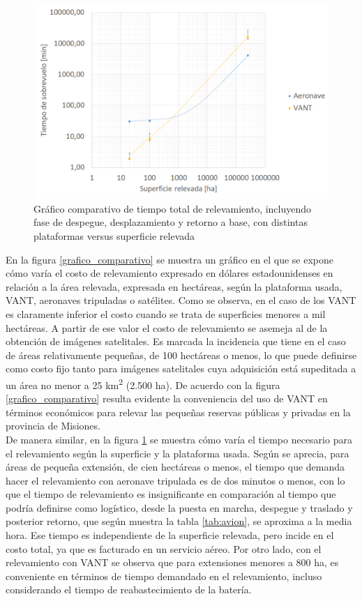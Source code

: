\begin{figure}[h!]
    \includegraphics[width=\textwidth]{Imagenes/grafico bloque 1-II.png}
     \hfill
     \caption{Gráfico comparativo de tiempo total de relevamiento, incluyendo fase de despegue, desplazamiento y retorno a base, con distintas plataformas versus superficie relevada}
    \label{grafico_comparativo-II}
\end{figure}

En la figura \ref{grafico_comparativo} se muestra un gráfico en el que se expone cómo varía el costo de relevamiento expresado en dólares estadounidenses en relación a la área relevada, expresada en hectáreas, según la plataforma usada, VANT, aeronaves tripuladas o satélites. Como se observa, en el caso de los VANT es claramente inferior el costo cuando se trata de superficies menores a mil hectáreas. A partir de ese valor el costo de relevamiento se asemeja al de la obtención de imágenes satelitales. Es marcada la incidencia que tiene en el caso de áreas relativamente pequeñas, de 100 hectáreas o menos, lo que puede definirse como costo fijo tanto para imágenes satelitales cuya adquisición está supeditada a un área no menor a 25 km\textsuperscript{2} (2.500 ha). De acuerdo con la figura \ref{grafico_comparativo} resulta evidente la conveniencia del uso de VANT en términos económicos para relevar las pequeñas reservas públicas y privadas en la provincia de Misiones. \\
De manera similar, en la figura \ref{grafico_comparativo-II} se muestra cómo varía el tiempo necesario para el relevamiento según la superficie y la plataforma usada. Según se aprecia, para áreas de pequeña extensión, de cien hectáreas o menos, el tiempo que demanda hacer el relevamiento con aeronave tripulada es de dos minutos o menos, con lo que el tiempo de relevamiento es insignificante en comparación al tiempo que podría definirse como logístico, desde la puesta en marcha, despegue y traslado y posterior retorno, que según muestra la tabla \ref{tab:avion}, se aproxima a la media hora. Ese tiempo es independiente de la superficie relevada, pero incide en el costo total, ya que es facturado en un servicio aéreo. Por otro lado, con el relevamiento con VANT se observa que para extensiones menores a 800 ha, es conveniente en términos de tiempo demandado en el relevamiento, incluso considerando el tiempo de reabastecimiento de la batería.

